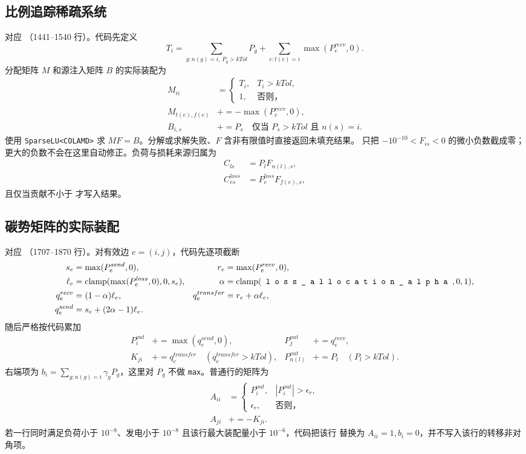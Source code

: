 \subsection{比例追踪稀疏系统}
对应 （1441--1540 行）。代码先定义
\begin{equation}
T_i=\sum_{g:n(g)=i,\,P_g>kTol}P_g
+\sum_{e:t(e)=i}\max(P_e^{recv},0).
\end{equation}
分配矩阵 $M$ 和源注入矩阵 $B$ 的实际装配为
\begin{align}
M_{ii}&=\begin{cases}T_i,&T_i>kTol,\\1,&\text{否则，}\end{cases}\\
M_{t(e),f(e)}&\mathrel{+}=-\max(P_e^{recv},0),\\
B_{i,s}&\mathrel{+}=P_s\quad\text{仅当 }P_s>kTol\text{ 且 }n(s)=i.
\end{align}
使用 \texttt{SparseLU<COLAMD>} 求 $MF=B$。分解或求解失败、$F$ 含非有限值时直接返回未填充结果。
只把 $-10^{-10}<F_{is}<0$ 的微小负数截成零；更大的负数不会在这里自动修正。负荷与损耗来源归属为
\begin{align}
C_{ls}&=P_lF_{n(l),s},\\
C_{es}^{loss}&=P_e^{loss}F_{f(e),s},
\end{align}
且仅当贡献不小于  才写入结果。

\subsection{碳势矩阵的实际装配}
对应 （1707--1870 行）。对有效边 $e=(i,j)$，代码先逐项截断
\begin{align}
s_e&=\max(P_e^{send},0),&r_e&=\max(P_e^{recv},0),\\
\ell_e&=\operatorname{clamp}(\max(P_e^{loss},0),0,s_e),&
\alpha&=\operatorname{clamp}(\fld{loss\_allocation\_alpha},0,1),\\
q_e^{recv}&=(1-\alpha)\ell_e,&
q_e^{transfer}&=r_e+\alpha\ell_e,\\
q_e^{send}&=s_e+(2\alpha-1)\ell_e.
\end{align}
随后严格按代码累加
\begin{align}
P_i^{out}&\mathrel{+}=\max(q_e^{send},0),&
P_j^{out}&\mathrel{+}=q_e^{recv},\\
K_{ji}&\mathrel{+}=q_e^{transfer}\quad(q_e^{transfer}>kTol),&
P_{n(l)}^{out}&\mathrel{+}=P_l\quad(P_l>kTol).
\end{align}
右端项为 $b_i=\sum_{g:n(g)=i}\gamma_gP_g$，这里对 $P_g$ 不做 \texttt{max}。普通行的矩阵为
\begin{align}
A_{ii}&=\begin{cases}P_i^{out},&|P_i^{out}|>\epsilon_r,\\\epsilon_r,&\text{否则，}\end{cases}\\
A_{ji}&\mathrel{+}=-K_{ji}.
\end{align}
若一行同时满足负荷小于 $10^{-8}$、发电小于 $10^{-8}$ 且该行最大装配量小于 $10^{-6}$，代码把该行
替换为 $A_{ii}=1,b_i=0$，并不写入该行的转移非对角项。

